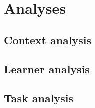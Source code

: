 \chapter{Analyses}


\section{Context analysis}

\section{Learner analysis}

\section{Task analysis}
